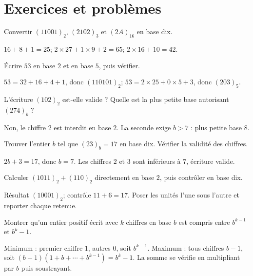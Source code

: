 \section{Exercices et problèmes}
\label{t11s-c11-e01}
Convertir $(11001)_2$, $(2102)_3$ et $(2A)_{16}$ en base dix.
\begin{corrige}\label{sol-t11s-c11-e01}
$16+8+1=25$; $2\times27+1\times9+2=65$; $2\times16+10=42$.
\end{corrige}
\label{t11s-c11-e02}
Écrire $53$ en base $2$ et en base $5$, puis vérifier.
\begin{corrige}\label{sol-t11s-c11-e02}
$53=32+16+4+1$, donc $(110101)_2$; $53=2\times25+0\times5+3$, donc $(203)_5$.
\end{corrige}
\label{t11s-c11-e03}
L’écriture $(102)_2$ est-elle valide ? Quelle est la plus petite base autorisant $(274)_b$ ?
\begin{corrige}\label{sol-t11s-c11-e03}
Non, le chiffre $2$ est interdit en base $2$. La seconde exige $b>7$ : plus petite base $8$.
\end{corrige}
\label{t11s-c11-e04}
Trouver l’entier $b$ tel que $(23)_b=17$ en base dix. Vérifier la validité des chiffres.
\begin{corrige}\label{sol-t11s-c11-e04}
$2b+3=17$, donc $b=7$. Les chiffres $2$ et $3$ sont inférieurs à $7$, écriture valide.
\end{corrige}
\label{t11s-c11-e05}
Calculer $(1011)_2+(110)_2$ directement en base $2$, puis contrôler en base dix.
\begin{corrige}\label{sol-t11s-c11-e05}
Résultat $(10001)_2$; contrôle $11+6=17$. Poser les unités l’une sous l’autre et reporter chaque retenue.
\end{corrige}
\exo[Bornes]\label{t11s-c11-e06}
Montrer qu’un entier positif écrit avec $k$ chiffres en base $b$ est compris entre $b^{k-1}$ et $b^k-1$.
\begin{corrige}\label{sol-t11s-c11-e06}
Minimum : premier chiffre $1$, autres $0$, soit $b^{k-1}$. Maximum : tous chiffres $b-1$, soit $(b-1)(1+b+\cdots+b^{k-1})=b^k-1$. La somme se vérifie en multipliant par $b$ puis soustrayant.
\end{corrige}

